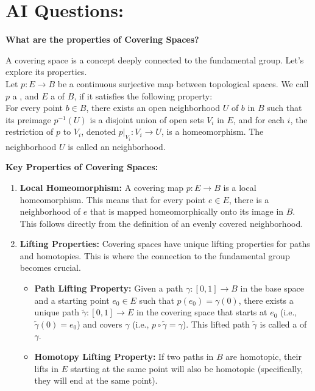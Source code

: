 \documentclass[12pt,a4paper]{report}
\begin{document}
\HLINE
\newpage

\section*{AI Questions:}

\begin{description}
	\item \textbf{What are the properties of Covering Spaces?}
	
	A covering space is a concept deeply connected to the fundamental group. Let's explore its properties.\\

Let \(p: E \to B\) be a continuous surjective map between topological spaces. We call \(p\) a , and \(E\) a  of \(B\), if it satisfies the following property:\\

For every point \(b \in B\), there exists an open neighborhood \(U\) of \(b\) in \(B\) such that its preimage \(p^{-1}(U)\) is a disjoint union of open sets \(V_i\) in \(E\), and for each \(i\), the restriction of \(p\) to \(V_i\), denoted \(p|_{V_i}: V_i \to U\), is a homeomorphism. The neighborhood \(U\) is called an  neighborhood.

 \textbf{Key Properties of Covering Spaces:}

\begin{enumerate}

\item \textbf{\textbf{Local Homeomorphism:}} A covering map \(p: E \to B\) is a local homeomorphism. This means that for every point \(e \in E\), there is a neighborhood of \(e\) that is mapped homeomorphically onto its image in \(B\). This follows directly from the definition of an evenly covered neighborhood.

\item \textbf{\textbf{Lifting Properties:}} Covering spaces have unique lifting properties for paths and homotopies. This is where the connection to the fundamental group becomes crucial.
\begin{itemize}
    \item \textbf{\textbf{Path Lifting Property:}} Given a path \(\gamma: [0, 1] \to B\) in the base space and a starting point \(e_0 \in E\) such that \(p(e_0) = \gamma(0)\), there exists a unique path \(\tilde{\gamma}: [0, 1] \to E\) in the covering space that starts at \(e_0\) (i.e., \(\tilde{\gamma}(0) = e_0\)) and covers \(\gamma\) (i.e., \(p \circ \tilde{\gamma} = \gamma\)). This lifted path \(\tilde{\gamma}\) is called a  of \(\gamma\).
    \item \textbf{\textbf{Homotopy Lifting Property:}} If two paths in \(B\) are homotopic, their lifts in \(E\) starting at the same point will also be homotopic (specifically, they will end at the same point).
\end{itemize}


\end{enumerate}
\end{description}
\end{document}
